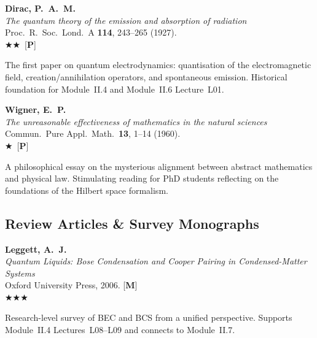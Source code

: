 \documentclass[11pt,a4paper]{article}
\newcommand{\essential}{$\bigstar\bigstar\bigstar$}
\newcommand{\recommended}{$\bigstar\bigstar$}
\newcommand{\useful}{$\bigstar$}
\newenvironment{bibentry}[1]{\begin{tcolorbox}[entrybox=#1,top=4pt,bottom=4pt]}{\end{tcolorbox}\smallskip}
\begin{document}
\begin{bibentry}{t5light}
\textbf{Dirac, P.~A.~M.}\\
\textit{The quantum theory of the emission and absorption of radiation}\\
Proc.~R.~Soc.~Lond.~A \textbf{114}, 243--265 (1927).\\[3pt]
\recommended\ [\textbf{P}]\\[3pt]
\begin{tcolorbox}[annotbox]
The first paper on quantum electrodynamics: quantisation of the electromagnetic
field, creation/annihilation operators, and spontaneous emission. Historical
foundation for Module~II.4 and Module~II.6 Lecture~L01.
\end{tcolorbox}
\end{bibentry}

\begin{bibentry}{t5light}
\textbf{Wigner, E.~P.}\\
\textit{The unreasonable effectiveness of mathematics in the natural sciences}\\
Commun.~Pure Appl.~Math.~\textbf{13}, 1--14 (1960).\\[3pt]
\useful\ [\textbf{P}]\\[3pt]
\begin{tcolorbox}[annotbox]
A philosophical essay on the mysterious alignment between abstract mathematics and
physical law. Stimulating reading for PhD students reflecting on the foundations of
the Hilbert space formalism.
\end{tcolorbox}
\end{bibentry}

\subsection{Review Articles \& Survey Monographs}

\begin{bibentry}{t5light}
\textbf{Leggett, A.~J.}\\
\textit{Quantum Liquids: Bose Condensation and Cooper Pairing in Condensed-Matter Systems}\\
Oxford University Press, 2006. [\textbf{M}]\\[3pt]
\essential\\[3pt]
\begin{tcolorbox}[annotbox]
Research-level survey of BEC and BCS from a unified perspective. Supports
Module~II.4 Lectures~L08--L09 and connects to Module~II.7.
\end{tcolorbox}
\end{bibentry}
\end{document}
